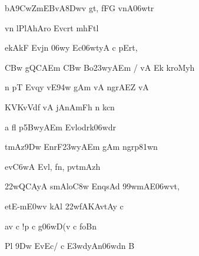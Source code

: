 {\dn b\5A\39CwZmEBvA\38Dw\4v\2 gt, fFG\5\2 vnA\306wtr \dontdisplaylinenum}

{\dn vn\? lPlAhAro Evcr\?t mhFtl\? \vegdn\dontdisplaylinenum}

{\dn ekAkF Evjn\? \306wy\? Ec\306wtyA c pErt,{\dandabdn} \dontdisplaylinenum}

{\dn \3CBw gQCAEm \3CBw Bo\323wyAEm / vA Ek\2 kroMyh \vegdn\dontdisplaylinenum}

{\dn n pT\2 Evqy\2 v\?E\394w g\5Am\2 vA ngrAEZ vA{\dandabdn} \dontdisplaylinenum}

{\dn K\?VKv\0Vd\?f\2 vA jAnAmFh n k\2cn \vegdn\dontdisplaylinenum}

{\dn a\2 f\4l\2 p\35BwyAEm Evlodrk\306wdr \dontdisplaylinenum}

{\dn tmAz\39Dw EnrF\323wyAEm g\5Am\2 ngrp\381wn \vegdn\dontdisplaylinenum}

{\dn ev\3C6wA  Evl, fn\4, pv\0tmAzh \dontdisplaylinenum}

{\dn {}\322wQCAyA\2 smAlo\3C8w EnqsAd \399wmAE\306wvt, \vegdn\dontdisplaylinenum}

{\dn etE-m\3E0w\?v kAl\?  \322wfAKAvtAy\0 c{\dandabdn} \dontdisplaylinenum}

{\dn av{\rdt} c !p\2 c g\306wD(v\2 c foBn \vegdn\dontdisplaylinenum}

{\dn Pl\2 \39Dw EvEc/\2 c \3E3wdyAn\306wdn\2 B \dontdisplaylinenum}

